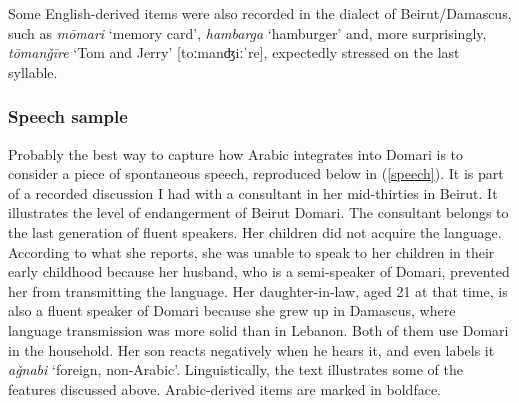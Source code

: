 \documentclass[output=paper]{langsci/langscibook}
\begin{document}
Some English-derived items were also recorded in the dialect of Beirut/Damascus, such as \textit{mōmari} ‘memory card’, \textit{hambarga} ‘hamburger’ and, more surprisingly, \textit{tōman\v{g}īre} ‘Tom and Jerry’ [toːmanʤiːˈre], expectedly stressed on the last syllable.


 \subsubsection{Speech sample}

Probably the best way to capture how Arabic integrates into Domari is to consider a piece of spontaneous speech, reproduced below in (\ref{speech}). It is part of a recorded discussion I had with a consultant in her mid-thirties in Beirut. It illustrates the level of endangerment of Beirut Domari. The consultant belongs to the last generation of fluent speakers. Her children did not acquire the language. According to what she reports, she was unable to speak to her children in their early childhood because her husband, who is a semi-speaker of Domari, prevented her from transmitting the language. Her daughter-in-law, aged 21 at that time, is also a fluent speaker of Domari because she grew up in Damascus, where language transmission was more solid than in Lebanon. Both of them use Domari in the household. Her son reacts negatively when he hears it, and even labels it \textit{a\v{g}nabi} ‘foreign, non-Arabic’. Linguistically, the text illustrates some of the features discussed above. Arabic-derived items are marked in boldface. 
\end{document}
